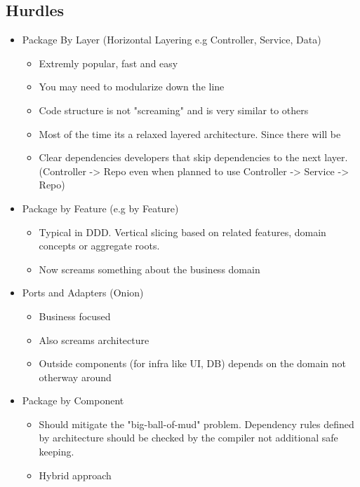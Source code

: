 \documentclass[../Main.tex]{subfiles}
\begin{document}
\subsection{Hurdles}
\begin{itemize}
    \item Package By Layer (Horizontal Layering e.g Controller, Service, Data)
          \begin{itemize}
              \item Extremly popular, fast and easy
              \item You may need to modularize down the line
              \item Code structure is not "screaming" and is very similar to others
              \item Most of the time its a relaxed layered architecture. Since there will be
              \item Clear dependencies
              developers that skip dependencies to the next layer. (Controller -> Repo even when planned to use Controller -> Service -> Repo)
          \end{itemize}

    \item Package by Feature (e.g by Feature)
          \begin{itemize}
              \item Typical in DDD. Vertical slicing based on related features, domain concepts or aggregate roots.
              \item Now screams something about the business domain
          \end{itemize}
    \item Ports and Adapters (Onion)
    \begin{itemize}
        \item Business focused
        \item Also screams architecture
        \item Outside components (for infra like UI, DB) depends on the domain not otherway around
    \end{itemize}
    \item Package by Component
    \begin{itemize}
        \item Should mitigate the "big-ball-of-mud" problem. Dependency rules defined by architecture should be checked by the compiler not additional safe keeping.
        \item Hybrid approach
    \end{itemize}
\end{itemize}
\end{document}
